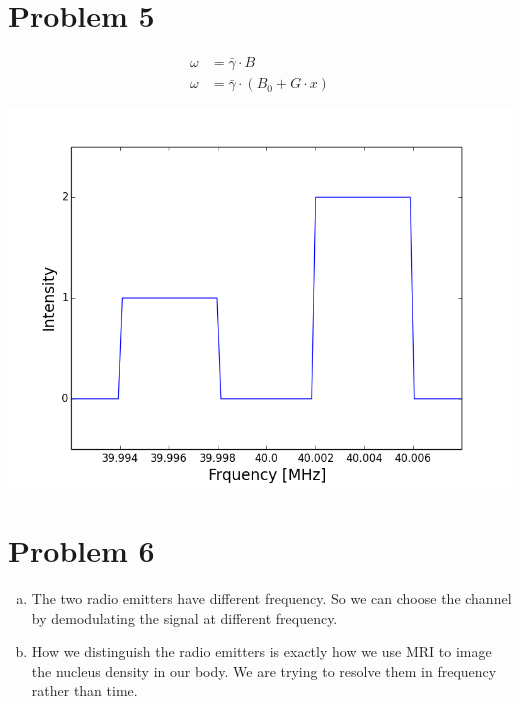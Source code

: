 \documentclass[12pt]{article}
\begin{document}
\section*{Problem 5}
\begin{align*}
\omega &= \bar{\gamma} \cdot B
\\\omega &= \bar{\gamma} \cdot (B_0 + G \cdot x) 
\end{align*}
\begin{center}
\includegraphics[width=0.7 \textwidth]{p5.png}
\end{center}


\section*{Problem 6}
\begin{enumerate}[a)]
\item The two radio emitters have different frequency. So we can choose the channel by demodulating the signal at different frequency.

\item How we distinguish the radio emitters is exactly how we use MRI to image the nucleus density in our body. We are trying to resolve them in frequency rather than time. 
\end{enumerate}
\end{document}
